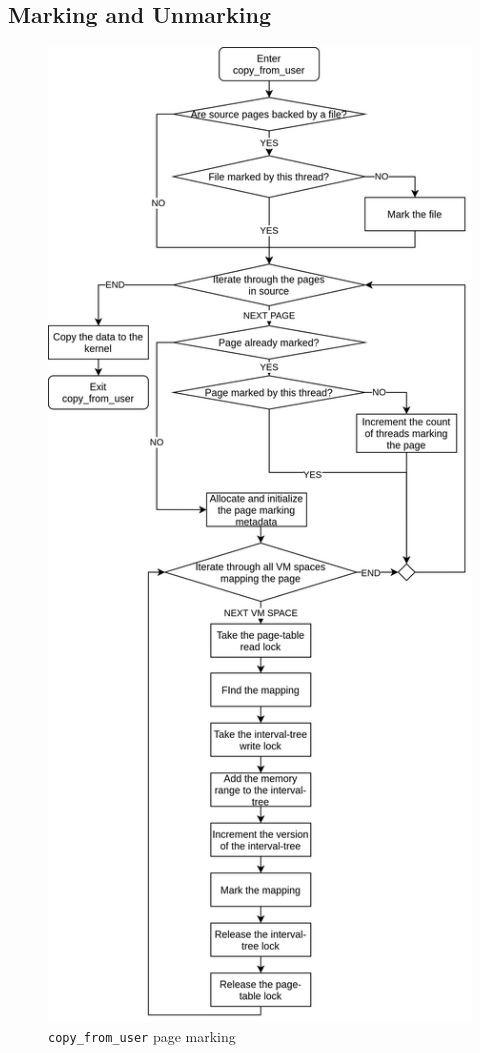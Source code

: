 \documentclass[conference]{IEEEtran}
\begin{document}
\subsection{Marking and Unmarking}

\begin{figure}[]
  \centering
  \includegraphics[width = 0.8\linewidth]{img/copy_from_user.png}
  \caption{\texttt{copy\_from\_user} page marking}
  \label{fig:copyfromuser}
\end{figure}
\end{document}
